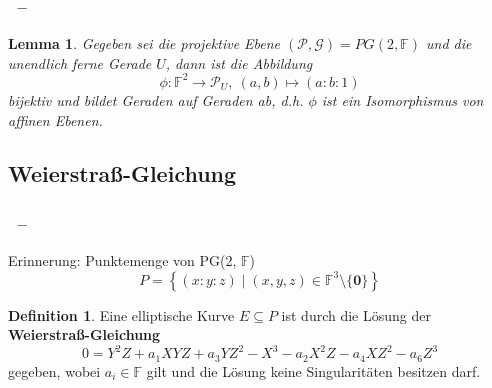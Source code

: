 \documentclass{beamer}
\theoremstyle{plain}
\newtheorem{lem}[thm]{Lemma}
\theoremstyle{definition}
\newtheorem{defn}[thm]{Definition}
\theoremstyle{rem}
\newcommand{\pgtwo}{PG(2, $\mathbb{F}$)\ }
\newcommand{\ftnz}{\mathbb{F}^{3}\setminus\{\boldsymbol 0\}}
\begin{document}

\begin{frame}
\frametitle{\insertsection~--~\insertsubsection}
\begin{lem}
    Gegeben sei die projektive Ebene $(\mathcal{P}, \mathcal{G}) = PG(2,\mathbb{F})$ und die unendlich ferne Gerade $U$, dann ist die Abbildung
    \begin{equation*}
        \phi: \mathbb{F}^2 \rightarrow \mathcal{P}_U,\ (a,b) \mapsto (a:b:1)
    \end{equation*}
    bijektiv und bildet Geraden auf Geraden ab, d.h. $\phi$ ist ein Isomorphismus von affinen Ebenen.
\end{lem}
\end{frame}

\subsection{Weierstraß-Gleichung}

\begin{frame}
\frametitle{\insertsection~--~\insertsubsection}
Erinnerung: Punktemenge von \pgtwo
\begin{equation*}
    P = \left\{(x:y:z) \mid (x,y,z) \in \ftnz \right\}
\end{equation*}
\begin{defn}
Eine elliptische Kurve $E\subseteq P$ ist durch die Lösung der \textbf{Weierstraß-Gleichung}
    \begin{equation*}
        0=Y^2Z + a_1XYZ + a_3YZ^2 - X^3 - a_2X^2Z - a_4XZ^2 - a_6Z^3
    \end{equation*}
    gegeben, wobei $a_i \in \mathbb{F}$ gilt und die Lösung keine Singularitäten besitzen darf.
\end{defn}
\end{frame}

\end{document}
